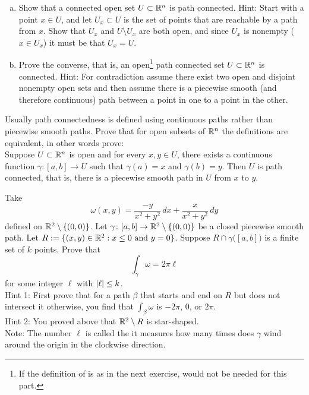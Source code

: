 \begin{exercise}
\pagebreak[2]
\leavevmode
\begin{enumerate}[a)]
\item
Show that a connected open set $U \subset {\mathbb{R}}^n$ is path connected.
Hint: Start with a
point $x \in U$, and let $U_x \subset U$ is the set of points that are
reachable by a path from $x$.  Show that $U_x$ and $U \setminus U_x$
are both open, and since $U_x$ is nonempty ($x \in U_x$) it must be
that $U_x = U$.
\item
Prove the converse, that is, an open\footnote{If the
definition of  is as in the next exercise,
 would not be needed for this part.}
path connected set $U \subset {\mathbb{R}}^n$ is
connected.  Hint: For contradiction assume there exist two open and disjoint nonempty open
sets and then assume there is a piecewise smooth (and therefore continuous)
path between a point in one to a point in the other.
\end{enumerate}
\end{exercise}

\begin{exercise}
Usually path connectedness is defined using continuous paths rather
than piecewise smooth paths.  Prove that for open subsets of ${\mathbb{R}}^n$
the definitions are equivalent, in
other words prove:\\
Suppose $U \subset {\mathbb{R}}^n$ is open and for every $x,y \in U$, there exists a continuous function
$\gamma \colon [a,b] \to U$ such that $\gamma(a) = x$ and $\gamma(b) = y$.
Then $U$ is path connected, that is, there is a piecewise smooth path in $U$ from
$x$ to $y$.
\end{exercise}

\begin{exercise}[Hard]
Take
\begin{equation*}
\omega(x,y) = \frac{-y}{x^2+y^2} \, dx + \frac{x}{x^2+y^2} \, dy
\end{equation*}
defined on ${\mathbb{R}}^2 \setminus \{ (0,0) \}$.  Let $\gamma \colon [a,b] \to {\mathbb{R}}^2
\setminus \{ (0,0) \}$ be a closed piecewise smooth path.
Let $R:=\{ (x,y) \in {\mathbb{R}}^2 : x \leq 0 \text{ and } y=0 \}$.
Suppose $R \cap \gamma\bigl([a,b]\bigr)$ is a finite set of $k$ points.
Prove that
\begin{equation*}
\int_{\gamma} \omega = 2 \pi \ell 
\end{equation*}
for some integer $\ell$ with $\left\lvert {\ell} \right\rvert \leq k$.\\
Hint 1: First prove that for a path $\beta$ that starts and end on $R$ but
does not intersect it otherwise, you find that $\int_{\beta} \omega$
is $-2\pi$, 0, or $2\pi$.
\\
Hint 2: You proved above that ${\mathbb{R}}^2 \setminus R$ is star-shaped.
\\
Note: The number $\ell$ is called the \emph{} it measures how many
times does $\gamma$ wind around the origin in the clockwise direction.
\end{exercise}
